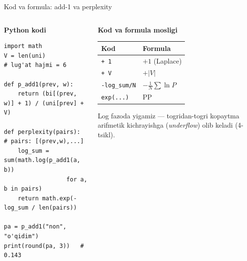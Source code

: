 \documentclass[aspectratio=169,11pt]{beamer}
\newcommand{\uzq}{\textquotesingle{}}
\begin{document}
\begin{frame}[fragile]{Kod va formula: add-1 va perplexity}
\scriptsize

\begin{columns}[T,totalwidth=\textwidth]
\begin{column}{0.58\textwidth}
\textbf{Python kodi}

\begin{tcolorbox}[defbox,left=2mm,right=2mm,top=1mm,bottom=1mm]
\begin{verbatim}
import math
V = len(uni)              # lug'at hajmi = 6

def p_add1(prev, w):
    return (bi[(prev, w)] + 1) / (uni[prev] + V)

def perplexity(pairs):    # pairs: [(prev,w),...]
    log_sum = sum(math.log(p_add1(a, b))
                  for a, b in pairs)
    return math.exp(-log_sum / len(pairs))

pa = p_add1("non", "o'qidim")
print(round(pa, 3))   # 0.143
\end{verbatim}
\end{tcolorbox}
\end{column}

\begin{column}{0.40\textwidth}
\textbf{Kod va formula mosligi}

\begin{tabular}{@{}l l@{}}
\toprule
\textbf{Kod} & \textbf{Formula} \\
\midrule
\texttt{+ 1}            & $+1$ (Laplace) \\
\texttt{+ V}            & $+|V|$ \\
\texttt{-log\_sum/N}    & $-\tfrac1N\sum\ln P$ \\
\texttt{exp(...)}       & $\mathrm{PP}$ \\
\bottomrule
\end{tabular}

\vspace{6pt}

\begin{tcolorbox}[okbox,left=2mm,right=2mm,top=1mm,bottom=1mm]
\scriptsize
Log fazoda yig\uzq{}amiz --- to\uzq{}g\uzq{}ridan-to\uzq{}g\uzq{}ri ko\uzq{}paytma
arifmetik kichrayishga (\textit{underflow}) olib keladi (4-tsikl).
\end{tcolorbox}
\end{column}
\end{columns}

\end{frame}
\end{document}
